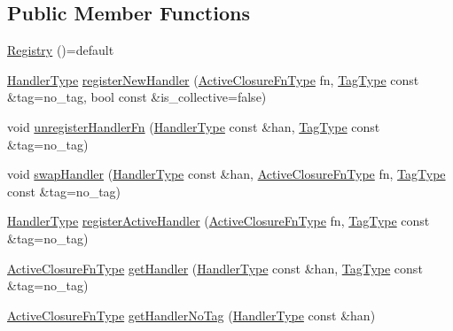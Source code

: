 \subsection*{Public Member Functions}
\begin{DoxyCompactItemize}
\item 
\hyperlink{structvt_1_1registry_1_1_registry_a319ac9c59641bee88d48e825a4840aa2}{Registry} ()=default
\item 
\hyperlink{namespacevt_af64846b57dfcaf104da3ef6967917573}{Handler\+Type} \hyperlink{structvt_1_1registry_1_1_registry_a2e3b140ef858712eb34deb89623cbbc3}{register\+New\+Handler} (\hyperlink{namespacevt_a2a06c34cafcd511828f16cbf1476b924}{Active\+Closure\+Fn\+Type} fn, \hyperlink{namespacevt_a84ab281dae04a52a4b243d6bf62d0e52}{Tag\+Type} const \&tag=no\+\_\+tag, bool const \&is\+\_\+collective=false)
\item 
void \hyperlink{structvt_1_1registry_1_1_registry_adaee9715edeb66b2fc8cd4639288a1cd}{unregister\+Handler\+Fn} (\hyperlink{namespacevt_af64846b57dfcaf104da3ef6967917573}{Handler\+Type} const \&han, \hyperlink{namespacevt_a84ab281dae04a52a4b243d6bf62d0e52}{Tag\+Type} const \&tag=no\+\_\+tag)
\item 
void \hyperlink{structvt_1_1registry_1_1_registry_affe7c413b570120f7ccb0af95d6e9181}{swap\+Handler} (\hyperlink{namespacevt_af64846b57dfcaf104da3ef6967917573}{Handler\+Type} const \&han, \hyperlink{namespacevt_a2a06c34cafcd511828f16cbf1476b924}{Active\+Closure\+Fn\+Type} fn, \hyperlink{namespacevt_a84ab281dae04a52a4b243d6bf62d0e52}{Tag\+Type} const \&tag=no\+\_\+tag)
\item 
\hyperlink{namespacevt_af64846b57dfcaf104da3ef6967917573}{Handler\+Type} \hyperlink{structvt_1_1registry_1_1_registry_ad4fdbf2cfbe4e852c5556435efe4255f}{register\+Active\+Handler} (\hyperlink{namespacevt_a2a06c34cafcd511828f16cbf1476b924}{Active\+Closure\+Fn\+Type} fn, \hyperlink{namespacevt_a84ab281dae04a52a4b243d6bf62d0e52}{Tag\+Type} const \&tag=no\+\_\+tag)
\item 
\hyperlink{namespacevt_a2a06c34cafcd511828f16cbf1476b924}{Active\+Closure\+Fn\+Type} \hyperlink{structvt_1_1registry_1_1_registry_a7ed0804483b7a1816b8b05429668f6c9}{get\+Handler} (\hyperlink{namespacevt_af64846b57dfcaf104da3ef6967917573}{Handler\+Type} const \&han, \hyperlink{namespacevt_a84ab281dae04a52a4b243d6bf62d0e52}{Tag\+Type} const \&tag=no\+\_\+tag)
\item 
\hyperlink{namespacevt_a2a06c34cafcd511828f16cbf1476b924}{Active\+Closure\+Fn\+Type} \hyperlink{structvt_1_1registry_1_1_registry_ae258a38c9a8237c900ecd40f3a4328d9}{get\+Handler\+No\+Tag} (\hyperlink{namespacevt_af64846b57dfcaf104da3ef6967917573}{Handler\+Type} const \&han)
\end{DoxyCompactItemize}


